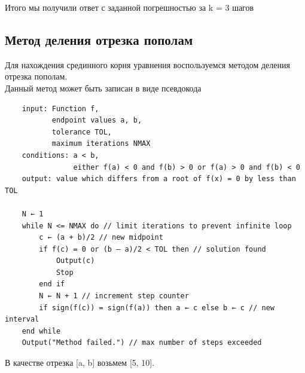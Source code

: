 \documentclass[letterpaper, 11pt]{extarticle}
\begin{document}
\noindent Итого мы получили ответ с заданной погрешностью за k = 3 шагов

\subsection*{Метод деления отрезка пополам}
Для нахождения срединного корня уравнения воспользуемся методом деления отрезка пополам.\\
Данный метод может быть записан в виде псевдокода
\begin{tcolorbox}[colback=gray!10, colframe=gray!50, title=Псевдокод Метода Деления Отрезка Пополам]
    \begin{verbatim}
    input: Function f,
           endpoint values a, b,
           tolerance TOL,
           maximum iterations NMAX
    conditions: a < b,
                either f(a) < 0 and f(b) > 0 or f(a) > 0 and f(b) < 0
    output: value which differs from a root of f(x) = 0 by less than TOL
    
    N ← 1
    while N <= NMAX do // limit iterations to prevent infinite loop
        c ← (a + b)/2 // new midpoint
        if f(c) = 0 or (b – a)/2 < TOL then // solution found
            Output(c)
            Stop
        end if
        N ← N + 1 // increment step counter
        if sign(f(c)) = sign(f(a)) then a ← c else b ← c // new interval
    end while
    Output("Method failed.") // max number of steps exceeded
    \end{verbatim}
\end{tcolorbox}

\noindent В качестве отрезка [a, b] возьмем [5, 10].\\
\end{document}
